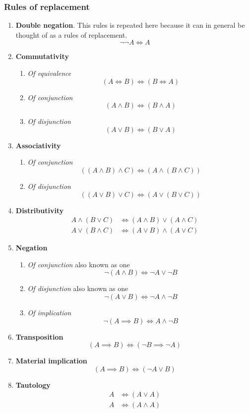 \subsubsection{Rules of replacement}
\begin{enumerate}
\item \textbf{Double negation}. This rules is repeated here because it can in general be thought of as a rules of replacement.
\[ \neg \neg A \iff A \]
\item \textbf{Commutativity}
\begin{enumerate}
\item \textit{Of equivalence} \[ (A\iff B) \iff (B\iff A) \]
\item \textit{Of conjunction} \[ (A\land B) \iff (B\land A) \]
\item \textit{Of disjunction} \[ (A\lor B) \iff (B\lor A) \]
\end{enumerate}
\item \textbf{Associativity}
\begin{enumerate}
\item \textit{Of conjunction} \[ ((A\land B)\land C) \iff (A \land(B\land C)) \]
\item \textit{Of disjunction} \[ ((A\lor B)\lor C) \iff (A \lor(B\lor C)) \]
\end{enumerate}
\item \textbf{Distributivity}
\begin{align*}
A \land (B\lor C) &\iff (A\land B)\lor(A\land C) \\
A \lor (B\land C) &\iff (A\lor B)\land(A\lor C)
\end{align*}
\item \textbf{Negation}
\begin{enumerate}
\item \textit{Of conjunction} also known as one  \[ \neg(A\land B) \iff \neg A \lor \neg B \]
\item \textit{Of disjunction} also known as one  \[ \neg(A\lor B) \iff \neg A \land \neg B \]
\item \textit{Of implication} \[ \neg(A\implies B) \iff A \land \neg B \]
\end{enumerate}
\item \textbf{Transposition} \[ (A \implies B) \iff (\neg B \implies \neg A) \]
\item \textbf{Material implication} \[ (A\implies B) \iff (\neg A \lor B) \]
\item \textbf{Tautology}
\begin{align*}
A &\iff (A\lor A) \\
A &\iff (A\land A)
\end{align*}
\end{enumerate}

